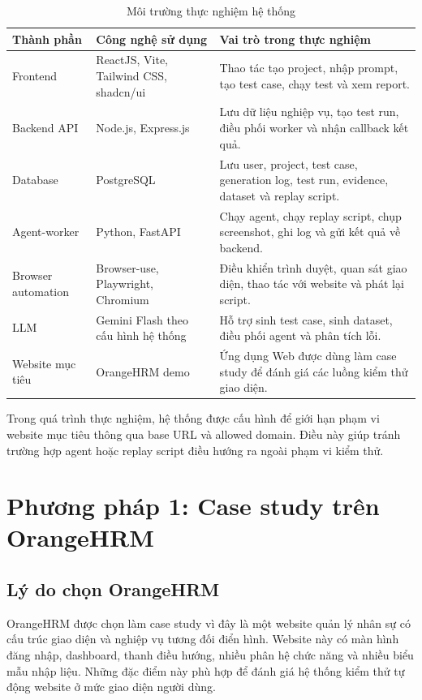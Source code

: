 \begin{table}[H]
\centering
\caption{Môi trường thực nghiệm hệ thống}
\label{tab:chapter6_experiment_environment}
\renewcommand{\arraystretch}{1.2}
\begin{tabular}{|p{4.0cm}|p{4.2cm}|p{6.0cm}|}
\hline
\textbf{Thành phần} & \textbf{Công nghệ sử dụng} & \textbf{Vai trò trong thực nghiệm} \\
\hline
Frontend & ReactJS, Vite, Tailwind CSS, shadcn/ui & Thao tác tạo project, nhập prompt, tạo test case, chạy test và xem report. \\
\hline
Backend API & Node.js, Express.js & Lưu dữ liệu nghiệp vụ, tạo test run, điều phối worker và nhận callback kết quả. \\
\hline
Database & PostgreSQL & Lưu user, project, test case, generation log, test run, evidence, dataset và replay script. \\
\hline
Agent-worker & Python, FastAPI & Chạy agent, chạy replay script, chụp screenshot, ghi log và gửi kết quả về backend. \\
\hline
Browser automation & Browser-use, Playwright, Chromium & Điều khiển trình duyệt, quan sát giao diện, thao tác với website và phát lại script. \\
\hline
LLM & Gemini Flash theo cấu hình hệ thống & Hỗ trợ sinh test case, sinh dataset, điều phối agent và phân tích lỗi. \\
\hline
Website mục tiêu & OrangeHRM demo & Ứng dụng Web được dùng làm case study để đánh giá các luồng kiểm thử giao diện. \\
\hline
\end{tabular}
\end{table}

Trong quá trình thực nghiệm, hệ thống được cấu hình để giới hạn phạm vi website mục tiêu thông qua base URL và allowed domain. Điều này giúp tránh trường hợp agent hoặc replay script điều hướng ra ngoài phạm vi kiểm thử.

\section{Phương pháp 1: Case study trên OrangeHRM}

\subsection{Lý do chọn OrangeHRM}

OrangeHRM được chọn làm case study vì đây là một website quản lý nhân sự có cấu trúc giao diện và nghiệp vụ tương đối điển hình. Website này có màn hình đăng nhập, dashboard, thanh điều hướng, nhiều phân hệ chức năng và nhiều biểu mẫu nhập liệu. Những đặc điểm này phù hợp để đánh giá hệ thống kiểm thử tự động website ở mức giao diện người dùng.

